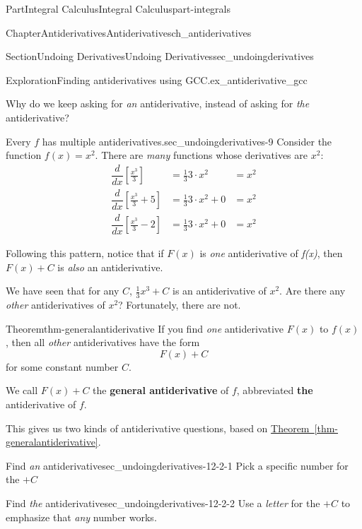 \documentclass{tufte-book}
\newcommand{\xreffont}{\relax}
\newcommand{\terminology}[1]{\textbf{#1}}
\numberwithin{equation}{chapter}
\newcommand{\ddxfrac}[1]{ \dfrac{d}{dx} \left[ #1 \right]  }
\newcommand{\amp}{&}
\begin{document}
\begin{partptx}{Part}{Integral Calculus}{}{Integral Calculus}{}{}{part-integrals}
\begin{chapterptx}{Chapter}{Antiderivatives}{}{Antiderivatives}{}{}{ch_antiderivatives}
\begin{sectionptx}{Section}{Undoing Derivatives}{}{Undoing Derivatives}{}{}{sec_undoingderivatives}
\begin{exploration}{Exploration}{Finding antiderivatives using GCC.}{ex_antiderivative_gcc}
\begin{enumerate}[font=\bfseries,label=(\alph*),ref=\alph*]
\begin{descriptionlist}
\end{descriptionlist}
%
\end{enumerate}%
\end{exploration}%
Why do we keep asking for \emph{an} antiderivative, instead of asking for \emph{the} antiderivative?%
\begin{paragraphs}{Every \(f\) has multiple antiderivatives.}{sec_undoingderivatives-9}%
Consider the function \(f(x)=x^2\). There are \emph{many} functions whose derivatives are \(x^2\):%
\begin{align*}
\ddxfrac{\frac{x^3}{3} } \amp = \frac{1}{3}3\cdot x^2 \amp =  x^2 \\
\ddxfrac{\frac{x^3}{3} + 5 } \amp = \frac{1}{3}3\cdot x^2 + 0 \amp =  x^2 \\
\ddxfrac{\frac{x^3}{3} - 2 } \amp = \frac{1}{3}3\cdot x^2 + 0 \amp =  x^2 
\end{align*}
%
\par
Following this pattern, notice that if \(F(x)\) is \emph{one} antiderivative of \emph{f(x)}, then \(F(x)+C \) is \emph{also} an antiderivative.%
\end{paragraphs}%
\par\medskip
We have seen that for any \(C\), \(\frac{1}{3}x^3+C\) is an antiderivative of \(x^2\). Are there any \emph{other} antiderivatives of \(x^2\)?  Fortunately, there are not.%
\begin{theorem}{Theorem}{}{}{thm-generalantiderivative}%
If you find \emph{one} antiderivative \(F(x)\) to \(f(x)\), then all \emph{other} antiderivatives have the form%
\begin{equation*}
F(x) + C
\end{equation*}
for some constant number \(C\).%
\par
We call \(F(x)+C\) the \terminology{general antiderivative} of \(f\), abbreviated \terminology{the} antiderivative of \(f\).%
\end{theorem}
This gives us two kinds of antiderivative questions, based on \hyperref[thm-generalantiderivative]{Theorem~{\xreffont\ref{thm-generalantiderivative}}}.%
\begin{descriptionlist}
\begin{dlimedium}{Find \emph{an} antiderivative}{sec_undoingderivatives-12-2-1}%
Pick a specific number for the \(+C\)%
\end{dlimedium}%
\begin{dlimedium}{Find \emph{the} antiderivative}{sec_undoingderivatives-12-2-2}%
Use a \emph{letter} for the \(+C\) to emphasize that \emph{any} number works.%

\end{dlimedium}
\end{descriptionlist}
\end{sectionptx}
\end{chapterptx}
\end{partptx}
\end{document}

